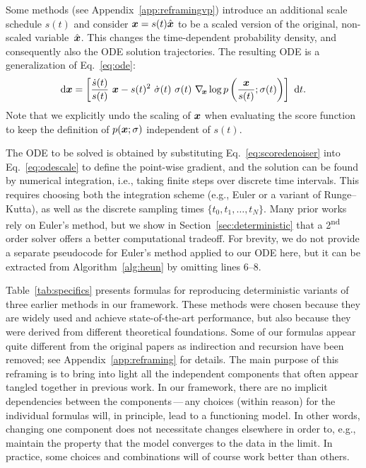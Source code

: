 \documentclass{article}
\begin{document}
\tabSpecifics

Some methods (see Appendix~{\ref{app:reframingvp}}) introduce an additional scale schedule $s(t)$ and consider $\boldsymbol{x} = s(t) \hat{\boldsymbol{x}}$ to be a scaled version of the original, non-scaled variable~$\hat{\boldsymbol{x}}$.
This changes the time-dependent probability density, and consequently also the ODE solution trajectories.
The resulting ODE is a generalization of Eq.~\ref{eq:ode}:
\begin{equation}
\label{eq:odescale}
\mathrm{d} \boldsymbol{x} = \left[ \frac{\dot {s}(t)}{s(t)} ~\boldsymbol{x} -s(t)^2 ~\dot\sigma(t) ~\sigma(t) ~\nabla_{\hspace{-0.5mm}\boldsymbol{x}} \log p\left(\frac{\boldsymbol{x}}{s(t)}; \sigma(t)\right) \right] ~\mathrm{d}t \text{.}
\end{equation}
Note that we explicitly undo the scaling of $\boldsymbol{x}$ when evaluating the score function to keep the definition of $p(\boldsymbol{x}; \sigma)$ independent of $s(t)$.

The ODE to be solved is obtained by substituting Eq.~\ref{eq:scoredenoiser} into Eq.~\ref{eq:odescale} to define the point-wise gradient,
  and the solution can be found by numerical integration, i.e., taking finite steps over discrete time intervals.
This requires choosing both the integration scheme (e.g., Euler or a variant of Runge--Kutta), as well as the discrete sampling times $\{t_0, t_1, \dots, t_N\}$.
Many prior works rely on Euler's method, but we show in Section~\ref{sec:deterministic} that a 2\textsuperscript{nd} order solver offers a better computational tradeoff.
For brevity, we do not provide a separate pseudocode for Euler's method applied to our ODE here, but it can be extracted from Algorithm~\ref{alg:heun} by omitting lines 6--8.

Table~\ref{tab:specifics} presents formulas for reproducing deterministic variants of three earlier methods in our framework.
These methods were chosen because they are widely used and achieve state-of-the-art performance, but also because they were derived from different theoretical foundations.
Some of our formulas appear quite different from the original papers as indirection and recursion have been removed; see Appendix~\ref{app:reframing} for details.
The main purpose of this reframing is to bring into light all the independent components that often appear tangled together in previous work.
In our framework, there are no implicit dependencies between the components\,---\,any choices (within reason) for the individual formulas will, in principle, lead to a functioning model.
{In other words, changing one component does not necessitate changes elsewhere in order to, e.g., maintain the property that the model converges to the data in the limit.
In practice, some choices and combinations will of course work better than others.}
\end{document}

